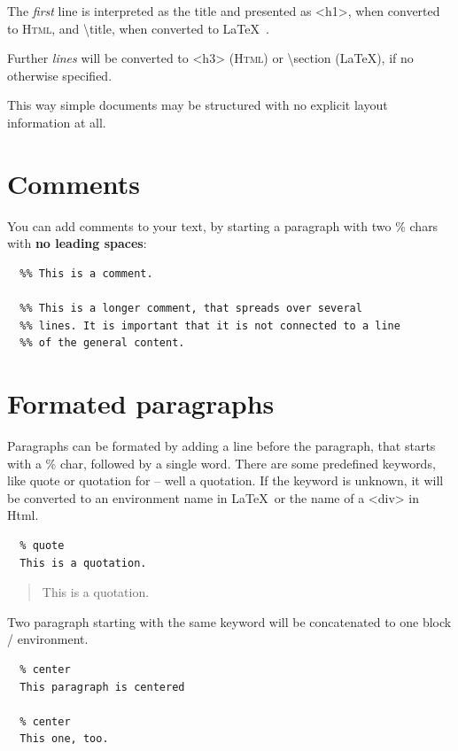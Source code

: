 \documentclass{article}
\begin{document}
{The \emph{first} line is interpreted as the title and presented as
 <h1>, when converted to \textsc{Html}, and \textbackslash title, when 
converted to \LaTeX\ .\\}

{Further \emph{lines} will be converted to <h3> (\textsc{Html}) or \textbackslash section
(LaTeX), if no otherwise specified.\\}

{This way simple documents may be structured with no explicit
layout information at all.\\}

\section{Comments}

{You can add comments to your text, by starting a paragraph
with two \% chars with \textbf{no leading spaces}:\\}

\begin{verbatim}
  %% This is a comment.

  %% This is a longer comment, that spreads over several
  %% lines. It is important that it is not connected to a line
  %% of the general content.
\end{verbatim}


\section{Formated paragraphs}

{Paragraphs can be formated by adding a line before the
paragraph, that starts with a \% char, followed by a single
word. There are some predefined keywords, like quote or
quotation for – well a quotation.
If the keyword is unknown, it will be converted to an environment
name in \LaTeX\  or the name of a <div> in Html.\\}

\begin{verbatim}
  % quote
  This is a quotation.
\end{verbatim}


\begin{quote}
This is a quotation.
\end{quote}


{Two paragraph starting with the same keyword will be
concatenated to one block / environment.\\}

\begin{verbatim}
  % center
  This paragraph is centered

  % center
  This one, too.
\end{verbatim}
\end{document}
